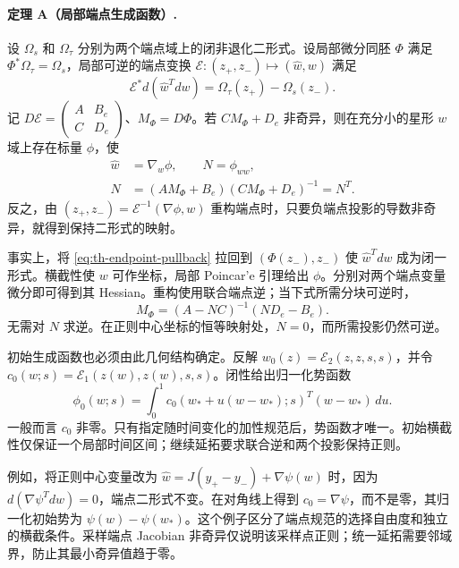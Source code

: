\paragraph{定理 A（局部端点生成函数）.}\label{thm:endpoint}
设 $\Omega_s$ 和 $\Omega_\tau$ 分别为两个端点域上的闭非退化二形式。设局部微分同胚 $\Phi$ 满足 $\Phi^*\Omega_\tau=\Omega_s$，局部可逆的端点变换 $\mathcal E:(z_+,z_-)\mapsto(\widehat w,w)$ 满足
\begin{equation}
 \mathcal E^*d(\widehat w^Tdw)=\Omega_\tau(z_+)-\Omega_s(z_-).
 \label{eq:th-endpoint-pullback}
\end{equation}
记 $D\mathcal E=\left(\begin{smallmatrix}A&B_e\\C&D_e\end{smallmatrix}\right)$、$M_\Phi=D\Phi$。若 $CM_\Phi+D_e$ 非奇异，则在充分小的星形 $w$ 域上存在标量 $\phi$，使
\begin{equation}
 \begin{aligned}
 \widehat w&=\nabla_w\phi,\qquad N=\phi_{ww},\\
 N&=(AM_\Phi+B_e)(CM_\Phi+D_e)^{-1}=N^T.
\end{aligned}
 \label{eq:th-endpoint-hessian}
\end{equation}
反之，由 $(z_+,z_-)=\mathcal E^{-1}(\nabla\phi,w)$ 重构端点时，只要负端点投影的导数非奇异，就得到保持二形式的映射。

事实上，将 \eqref{eq:th-endpoint-pullback} 拉回到 $(\Phi(z_-),z_-)$ 使 $\widehat w^Tdw$ 成为闭一形式。横截性使 $w$ 可作坐标，局部 Poincar'e 引理给出 $\phi$。分别对两个端点变量微分即可得到其 Hessian。重构使用联合端点逆；当下式所需分块可逆时，
\begin{equation}
 M_\Phi=(A-NC)^{-1}(ND_e-B_e).
 \label{eq:th-endpoint-reconstruction}
\end{equation}
无需对 $N$ 求逆。在正则中心坐标的恒等映射处，$N=0$，而所需投影仍然可逆。

初始生成函数也必须由此几何结构确定。反解 $w_0(z)=\mathcal E_2(z,z,s,s)$，并令 $c_0(w;s)=\mathcal E_1(z(w),z(w),s,s)$。闭性给出归一化势函数
\begin{equation}
 \phi_0(w;s)=\int_0^1 c_0(w_*+u(w-w_*);s)^T(w-w_*)\,du .
 \label{eq:th-initial-gauge}
\end{equation}
一般而言 $c_0$ 非零。只有指定随时间变化的加性规范后，势函数才唯一。初始横截性仅保证一个局部时间区间；继续延拓要求联合逆和两个投影保持正则。

例如，将正则中心变量改为 $\widehat w=J(y_+-y_-)+\nabla\psi(w)$ 时，因为 $d(\nabla\psi^Tdw)=0$，端点二形式不变。在对角线上得到 $c_0=\nabla\psi$，而不是零，其归一化初始势为 $\psi(w)-\psi(w_*)$。这个例子区分了端点规范的选择自由度和独立的横截条件。采样端点 Jacobian 非奇异仅说明该采样点正则；统一延拓需要邻域界，防止其最小奇异值趋于零。

